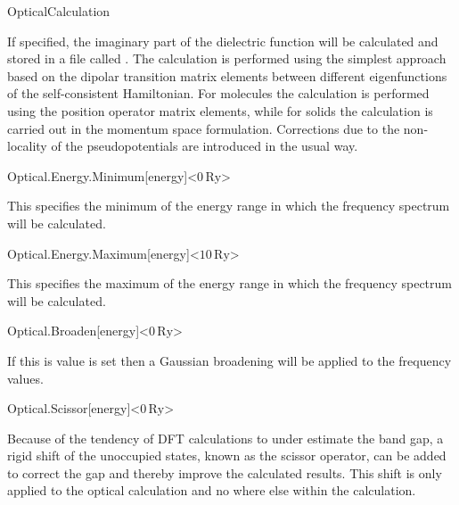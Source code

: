 \begin{fdflogicalF}{OpticalCalculation}
  
    If specified, the imaginary part of the dielectric function will be
    calculated and stored in a file called . The
    calculation is performed using the simplest approach based on the
    dipolar transition matrix elements between different eigenfunctions
    of the self-consistent Hamiltonian. For molecules the calculation is
    performed using the position operator matrix elements, while for
    solids the calculation is carried out in the momentum space
    formulation. Corrections due to the non-locality of the
    pseudopotentials are introduced in the usual way.
  
  \end{fdflogicalF}
  
  \begin{fdfentry}{Optical.Energy.Minimum}[energy]<$0\,\mathrm{Ry}$>
  
    This specifies the minimum of the energy range in which the
    frequency spectrum will be calculated.
  
  \end{fdfentry}
  
  \begin{fdfentry}{Optical.Energy.Maximum}[energy]<$10\,\mathrm{Ry}$>
  
    This specifies the maximum of the energy range in which the
    frequency spectrum will be calculated.
  
  \end{fdfentry}
  
  \begin{fdfentry}{Optical.Broaden}[energy]<$0\,\mathrm{Ry}$>
  
    If this is value is set then a Gaussian broadening will be applied
    to the frequency values.
  
  \end{fdfentry}
  
  \begin{fdfentry}{Optical.Scissor}[energy]<$0\,\mathrm{Ry}$>
  
    Because of the tendency of DFT calculations to under estimate the
    band gap, a rigid shift of the unoccupied states, known as the
    scissor operator, can be added to correct the gap and thereby
    improve the calculated results. This shift is only applied to the
    optical calculation and no where else within the calculation.
  
  \end{fdfentry}
  
